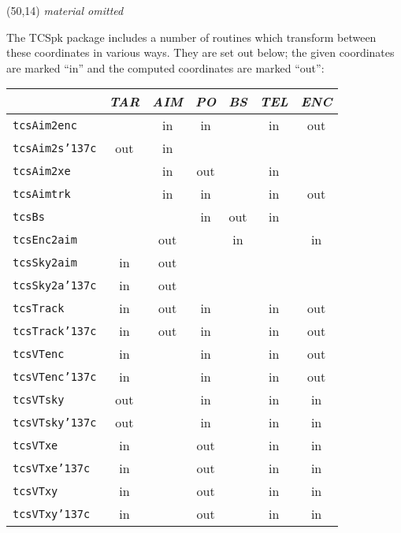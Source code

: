 \documentclass[12pt,fleqn,twoside]{article}
\renewcommand{\_}{{\tt\char'137}}     %
\newcommand{\abridged}  {\vspace{3ex} \begin{center}
                        \framebox(50,14){\vspace*{1mm}
                        \large \it material omitted}
                        \end{center}\vspace{3ex}}
\begin{document}
\ifx\vdoc\vshort
\abridged
\else
The TCSpk package includes a number of routines which transform
between these coordinates in various ways.  They are set out below;
the given coordinates are marked ``in'' and the computed coordinates are
marked ``out'':

\begin{center}
\begin{tabular}{|l||c|c|c|c|c|c|} \hline
                  & {\it TAR}
                         & {\it AIM}
                               & {\it PO}
                                     & {\it BS}
                                           & {\it TEL}
                                                 & {\it ENC}
                                                       \\ \hline \hline
{\tt tcsAim2enc } &     & in  & in  &     & in  & out \\ \hline
{\tt tcsAim2s\_c} & out & in  &     &     &     &     \\ \hline
{\tt tcsAim2xe  } &     & in  & out &     & in  &     \\ \hline
{\tt tcsAimtrk  } &     & in  & in  &     & in  & out \\ \hline
{\tt tcsBs      } &     &     & in  & out & in  &     \\ \hline
{\tt tcsEnc2aim } &     & out &     & in  &     & in  \\ \hline
{\tt tcsSky2aim } & in  & out &     &     &     &     \\ \hline
{\tt tcsSky2a\_c} & in  & out &     &     &     &     \\ \hline
{\tt tcsTrack   } & in  & out & in  &     & in  & out \\ \hline
{\tt tcsTrack\_c} & in  & out & in  &     & in  & out \\ \hline
{\tt tcsVTenc   } & in  &     & in  &     & in  & out \\ \hline
{\tt tcsVTenc\_c} & in  &     & in  &     & in  & out \\ \hline
{\tt tcsVTsky   } & out &     & in  &     & in  & in  \\ \hline
{\tt tcsVTsky\_c} & out &     & in  &     & in  & in  \\ \hline
{\tt tcsVTxe    } & in  &     & out &     & in  & in  \\ \hline
{\tt tcsVTxe\_c } & in  &     & out &     & in  & in  \\ \hline
{\tt tcsVTxy    } & in  &     & out &     & in  & in  \\ \hline
{\tt tcsVTxy\_c } & in  &     & out &     & in  & in  \\ \hline
\end{tabular}
\\
\end{center}
\end{document}
